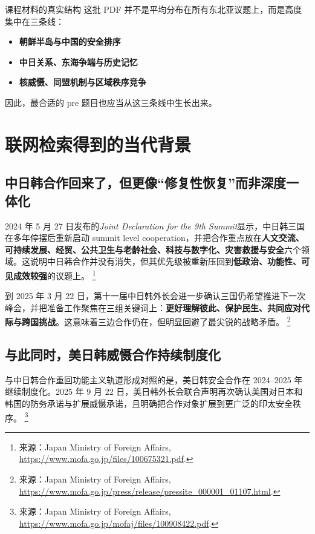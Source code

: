 \documentclass[a4paper]{article}
\begin{document}
\begin{findingbox}{课程材料的真实结构}
这批 PDF 并不是平均分布在所有东北亚议题上，而是高度集中在三条线：
\begin{itemize}
\item \textbf{朝鲜半岛与中国的安全排序}
\item \textbf{中日关系、东海争端与历史记忆}
\item \textbf{核威慑、同盟机制与区域秩序竞争}
\end{itemize}
因此，最合适的 pre 题目也应当从这三条线中生长出来。
\end{findingbox}

\section{联网检索得到的当代背景}

\subsection{中日韩合作回来了，但更像``修复性恢复''而非深度一体化}

2024 年 5 月 27 日发布的\textit{Joint Declaration for the 9th Summit}显示，中日韩三国在多年停摆后重新启动 summit level cooperation，并把合作重点放在\textbf{人文交流、可持续发展、经贸、公共卫生与老龄社会、科技与数字化、灾害救援与安全}六个领域。这说明中日韩合作并没有消失，但其优先级被重新压回到\textbf{低政治、功能性、可见成效较强}的议题上。%
\footnote{来源：Japan Ministry of Foreign Affairs, \url{https://www.mofa.go.jp/files/100675321.pdf}.}

到 2025 年 3 月 22 日，第十一届中日韩外长会进一步确认三国仍希望推进下一次峰会，并把准备工作聚焦在三组关键词上：\textbf{更好理解彼此、保护民生、共同应对代际与跨国挑战}。这意味着三边合作仍在，但明显回避了最尖锐的战略矛盾。%
\footnote{来源：Japan Ministry of Foreign Affairs, \url{https://www.mofa.go.jp/press/release/pressite_000001_01107.html}.}

\subsection{与此同时，美日韩威慑合作持续制度化}

与中日韩合作重回功能主义轨道形成对照的是，美日韩安全合作在 2024--2025 年继续制度化。2025 年 9 月 22 日，美日韩外长会联合声明再次确认美国对日本和韩国的防务承诺与扩展威慑承诺，且明确把合作对象扩展到更广泛的印太安全秩序。%
\footnote{来源：Japan Ministry of Foreign Affairs, \url{https://www.mofa.go.jp/mofaj/files/100908422.pdf}.}
\end{document}
